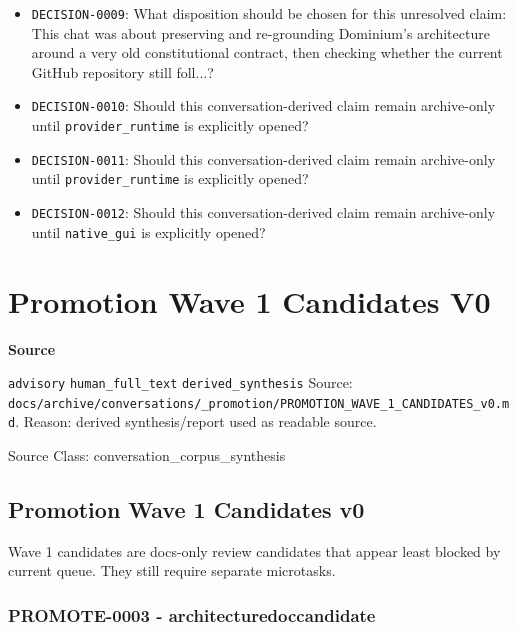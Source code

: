 \documentclass[9pt,a4paper,openany]{book}
\newcommand{\vonecallout}[3]{\par\medskip\noindent\begingroup\setlength{\fboxsep}{7pt}\colorbox{DomCalloutBg}{\parbox{0.94\linewidth}{\textbf{\textcolor{#1}{#2}}\par #3}}\endgroup\par\medskip}
\begin{document}
\begin{itemize}
\item \texttt{DECISION-\allowbreak{}0009}: What disposition should be chosen for this unresolved claim: This chat was about preserving and re-\allowbreak{}grounding Dominium's architecture around a very old constitutional contract, then checking whether the current GitHub repository still foll.\allowbreak{}.\allowbreak{}.\allowbreak{}?
\item \texttt{DECISION-\allowbreak{}0010}: Should this conversation-\allowbreak{}derived claim remain archive-\allowbreak{}only until \texttt{provider\_\allowbreak{}runtime} is explicitly opened?
\item \texttt{DECISION-\allowbreak{}0011}: Should this conversation-\allowbreak{}derived claim remain archive-\allowbreak{}only until \texttt{provider\_\allowbreak{}runtime} is explicitly opened?
\item \texttt{DECISION-\allowbreak{}0012}: Should this conversation-\allowbreak{}derived claim remain archive-\allowbreak{}only until \texttt{native\_\allowbreak{}gui} is explicitly opened?
\end{itemize}



\section{Promotion Wave 1 Candidates V0}

\vonecallout{DomSlate}{Source}{\texttt{advisory} \texttt{human\_\allowbreak{}full\_\allowbreak{}text} \texttt{derived\_\allowbreak{}synthesis} Source: \texttt{docs/\allowbreak{}archive/\allowbreak{}conversations/\allowbreak{}\_\allowbreak{}promotion/\allowbreak{}PROMOTION\_\allowbreak{}WAVE\_\allowbreak{}1\_\allowbreak{}CANDIDATES\_\allowbreak{}v0.\allowbreak{}md}.\allowbreak{} Reason: derived synthesis/\allowbreak{}report used as readable source.\allowbreak{}}

Source Class: conversation\_\allowbreak{}corpus\_\allowbreak{}synthesis



\subsection{Promotion Wave 1 Candidates v0}

Wave 1 candidates are docs-\allowbreak{}only review candidates that appear least blocked by current queue.\allowbreak{} They still require separate microtasks.\allowbreak{}


\subsubsection{PROMOTE-0003 - architecturedoccandidate}
\end{document}
